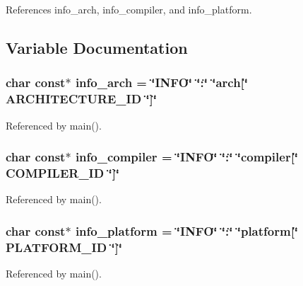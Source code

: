 References info\-\_\-arch, info\-\_\-compiler, and info\-\_\-platform.



\subsection{Variable Documentation}
\subsubsection[{info\-\_\-arch}]{\setlength{\rightskip}{0pt plus 5cm}char const$\ast$ info\-\_\-arch = \char`\"{}I\-N\-F\-O\char`\"{} \char`\"{}\-:\char`\"{} \char`\"{}arch[\char`\"{} A\-R\-C\-H\-I\-T\-E\-C\-T\-U\-R\-E\-\_\-\-I\-D \char`\"{}]\char`\"{}}\label{CMakeCCompilerId_8c_a59647e99d304ed33b15cb284c27ed391}


Referenced by main().

\subsubsection[{info\-\_\-compiler}]{\setlength{\rightskip}{0pt plus 5cm}char const$\ast$ info\-\_\-compiler = \char`\"{}I\-N\-F\-O\char`\"{} \char`\"{}\-:\char`\"{} \char`\"{}compiler[\char`\"{} C\-O\-M\-P\-I\-L\-E\-R\-\_\-\-I\-D \char`\"{}]\char`\"{}}\label{CMakeCCompilerId_8c_a4b0efeb7a5d59313986b3a0390f050f6}


Referenced by main().

\subsubsection[{info\-\_\-platform}]{\setlength{\rightskip}{0pt plus 5cm}char const$\ast$ info\-\_\-platform = \char`\"{}I\-N\-F\-O\char`\"{} \char`\"{}\-:\char`\"{} \char`\"{}platform[\char`\"{} P\-L\-A\-T\-F\-O\-R\-M\-\_\-\-I\-D \char`\"{}]\char`\"{}}\label{CMakeCCompilerId_8c_a2321403dee54ee23f0c2fa849c60f7d4}


Referenced by main().

